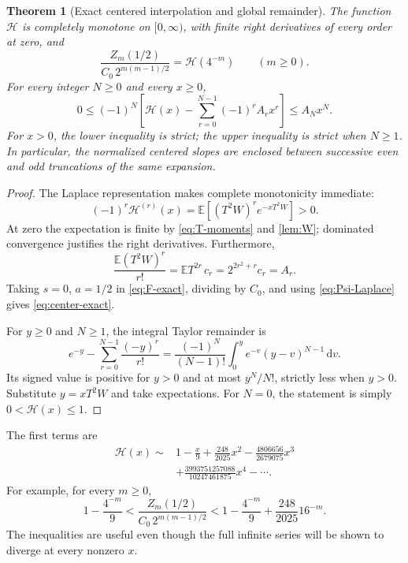 \documentclass[11pt,a4paper]{article}
\numberwithin{equation}{section}
\newtheorem{theorem}{Theorem}[section]
\theoremstyle{definition}
\theoremstyle{remark}
\newcommand{\E}{\mathbb E}
\newcommand{\dd}{\,\mathrm d}
\newcommand{\calH}{\mathcal H}
\begin{document}
\begin{theorem}[Exact centered interpolation and global remainder]
\label{thm:alternating}
The function $\calH$ is completely monotone on $[0,\infty)$, with
finite right derivatives of every order at zero, and
\begin{equation}
 \boxed{\displaystyle
 \frac{Z_m(1/2)}{C_0\,2^{m(m-1)/2}}=\calH(4^{-m})
 \qquad(m\ge0).}
 \label{eq:center-exact}
\end{equation}
For every integer $N\ge0$ and every $x\ge0$,
\begin{equation}
 \boxed{\displaystyle
 0\le(-1)^N\left[\calH(x)-\sum_{r=0}^{N-1}(-1)^rA_rx^r\right]
       \le A_Nx^N.}
 \label{eq:alternating-bound}
\end{equation}
For $x>0$, the lower inequality is strict; the upper inequality is
strict when $N\ge1$. In particular, the normalized centered slopes
are enclosed between successive even and odd truncations of the
same expansion.
\end{theorem}
\begin{proof}
The Laplace representation makes complete monotonicity immediate:
\[
 (-1)^r\calH^{(r)}(x)=\E[(T^2W)^r e^{-xT^2W}]>0.
\]
At zero the expectation is finite by \cref{eq:T-moments} and
\cref{lem:W}; dominated convergence justifies the right derivatives.
Furthermore,
\[
 \frac{\E(T^2W)^r}{r!}
 =\E T^{2r}\,c_r=2^{2r^2+r}c_r=A_r.
\]
Taking $s=0$, $a=1/2$ in \cref{eq:F-exact}, dividing by $C_0$,
and using \cref{eq:Psi-Laplace} gives \cref{eq:center-exact}.

For $y\ge0$ and $N\ge1$, the integral Taylor remainder is
\[
 e^{-y}-\sum_{r=0}^{N-1}\frac{(-y)^r}{r!}
 =\frac{(-1)^N}{(N-1)!}\int_0^y e^{-v}(y-v)^{N-1}\dd v.
\]
Its signed value is positive for $y>0$ and at most $y^N/N!$,
strictly less when $y>0$. Substitute $y=xT^2W$ and take expectations.
For $N=0$, the statement is simply $0<\calH(x)\le1$.
\end{proof}

The first terms are
\begin{align}
 \calH(x)\sim{}&1-\frac{x}{9}
       +\frac{248}{2025}x^2
       -\frac{4806656}{2679075}x^3\nonumber\\
 &+\frac{3993751257088}{10247461875}x^4-\cdots.
 \label{eq:calH-first}
\end{align}
For example, for every $m\ge0$,
\begin{equation}
 1-\frac{4^{-m}}9
 <\frac{Z_m(1/2)}{C_0\,2^{m(m-1)/2}}
 <1-\frac{4^{-m}}9+\frac{248}{2025}16^{-m}.
 \label{eq:center-low-bounds}
\end{equation}
The inequalities are useful even though the full infinite series
will be shown to diverge at every nonzero $x$.
\end{document}
